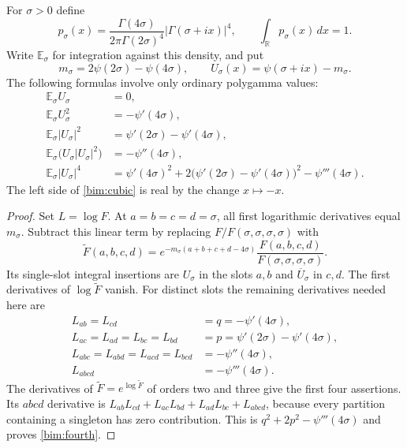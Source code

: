 For $\sigma>0$ define
\begin{equation}\label{bim:density}
 p_\sigma(x)=\frac{\Gamma(4\sigma)}
                   {2\pi\Gamma(2\sigma)^4}
                        |\Gamma(\sigma+ix)|^4,
 \qquad \int_{\mathbb R}p_\sigma(x)\,dx=1.
\end{equation}
Write $\mathbb E_\sigma$ for integration against this density, and put
\begin{equation}\label{bim:center}
 m_\sigma=2\psi(2\sigma)-\psi(4\sigma),\qquad
 U_\sigma(x)=\psi(\sigma+ix)-m_\sigma.
\end{equation}
The following formulas involve only ordinary polygamma values:
\begin{align}
 \mathbb E_\sigma U_\sigma&=0,\label{bim:mean}\\
 \mathbb E_\sigma U_\sigma^2&=-\psi'(4\sigma),
                                               \label{bim:square}\\
 \mathbb E_\sigma|U_\sigma|^2
          &=\psi'(2\sigma)-\psi'(4\sigma),      \label{bim:abs-square}\\
 \mathbb E_\sigma\bigl(U_\sigma|U_\sigma|^2\bigr)
          &=-\psi''(4\sigma),                  \label{bim:cubic}\\
 \mathbb E_\sigma|U_\sigma|^4
          &=\psi'(4\sigma)^2
             +2\bigl(\psi'(2\sigma)-\psi'(4\sigma)\bigr)^2
             -\psi'''(4\sigma).                \label{bim:fourth}
\end{align}
The left side of \eqref{bim:cubic} is real by the change $x\mapsto-x$.

\begin{proof}
Set $L=\log F$.  At $a=b=c=d=\sigma$, all first logarithmic
derivatives equal $m_\sigma$.  Subtract this linear term by replacing
$F/F(\sigma,\sigma,\sigma,\sigma)$ with
\[
 \widetilde F(a,b,c,d)
 =e^{-m_\sigma(a+b+c+d-4\sigma)}
      \frac{F(a,b,c,d)}{F(\sigma,\sigma,\sigma,\sigma)}.
\]
Its single-slot integral insertions are $U_\sigma$ in the slots $a,b$
and $\overline U_\sigma$ in $c,d$.  The first derivatives of
$\log\widetilde F$ vanish.  For distinct slots the remaining derivatives
needed here are
\begin{align*}
 L_{ab}=L_{cd}&=q=-\psi'(4\sigma),\\
 L_{ac}=L_{ad}=L_{bc}=L_{bd}
      &=p=\psi'(2\sigma)-\psi'(4\sigma),\\
 L_{abc}=L_{abd}=L_{acd}=L_{bcd}&=-\psi''(4\sigma),\\
 L_{abcd}&=-\psi'''(4\sigma).
\end{align*}
The derivatives of $\widetilde F=e^{\log\widetilde F}$ of orders two
and three give the first four assertions.  Its $abcd$ derivative is
$L_{ab}L_{cd}+L_{ac}L_{bd}+L_{ad}L_{bc}+L_{abcd}$, because every
partition containing a singleton has zero contribution.  This is
$q^2+2p^2-\psi'''(4\sigma)$ and proves \eqref{bim:fourth}.
\end{proof}

